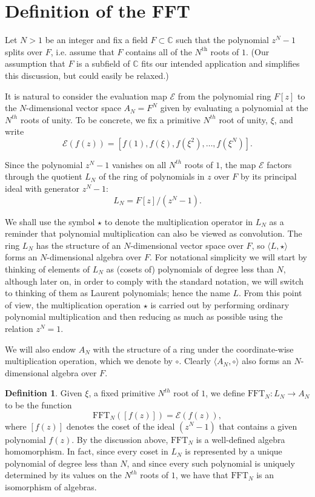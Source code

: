 \documentclass[12pt, letterpaper, oneside]{amsart}
\theoremstyle{definition}
\newtheorem{definition}[para]{Definition}
\theoremstyle{plain}
\numberwithin{equation}{para}
\numberwithin{figure}{section}
\newcommand{\CC}{\mathbb{C}}
\newcommand{\FFT}{\text{FFT}}
\renewcommand{\th}{\text{th}}
\newcommand{\eval}{\mathcal{E}}
\begin{document}
\section{Definition of the FFT}
Let $N > 1$ be an integer and fix a field $F\subset\CC$ such that the polynomial
$z^N - 1$ splits over $F$, i.e. assume that $F$ contains all of the $N^\th$
roots of $1$.  (Our assumption that $F$ is a subfield of $\CC$ fits our intended
application and simplifies this discussion, but could easily be relaxed.)

It is natural to consider the evaluation map $\eval$ from the polynomial ring
$F[z]$ to the $N$-dimensional vector space $A_N=F^N$ given by evaluating a
polynomial at the $N^{th}$ roots of unity.  To be concrete, we fix a primitive
$N^{th}$ root of unity, $\xi$, and write
\[ \eval(f(z)) = [f(1), f(\xi), f(\xi^2), \ldots, f(\xi^N)] . \]

Since the polynomial $z^N - 1$ vanishes on all $N^{th}$ roots of $1$, the map
$\eval$ factors through the quotient $L_N$ of the ring of polynomials in $z$ over $F$
by its principal ideal with generator $z^N - 1$:
$$L_N = F[z]/(z^N - 1).$$

We shall use the symbol $\star$ to denote the multiplication operator in $L_N$
as a reminder that polynomial multiplication can also be viewed as convolution.
The ring $L_N$ has the structure of an $N$-dimensional vector space over $F$, so
$\langle L, \star\rangle$ forms an $N$-dimensional algebra over $F$.  For
notational simplicity we will start by thinking of elements of $L_N$ as (cosets
of) polynomials of degree less than $N$, although later on, in order to comply
with the standard notation, we will switch to thinking of them as Laurent
polynomials; hence the name $L$.  From this point of view, the multiplication
operation $\star$ is carried out by performing ordinary polynomial
multiplication and then reducing as much as possible using the relation
$z^N = 1$.

We will also endow $A_N$ with the structure of a ring under the coordinate-wise
multiplication operation, which we denote by $\circ$.  Clearly
$\langle A_N, \circ\rangle$ also forms an $N$-dimensional algebra over $F$.

\begin{definition}\label{definition:fft}
Given $\xi$, a fixed primitive $N^{th}$ root of $1$, we define
$\FFT_N:L_N \to A_N$ to be the function
\[ \FFT_N([f(z)]) = \eval(f(z)), \]
where $[f(z)]$ denotes the coset of the ideal $(z^N - 1)$ that contains
a given polynomial $f(z)$.  By the discussion above, $\FFT_N$ is a well-defined
algebra homomorphism.  In fact, since every coset in $L_N$ is represented
by a unique polynomial of degree less than $N$, and since every such polynomial
is uniquely determined by its values on the $N^{th}$ roots of $1$, we have
that $\FFT_N$ is an isomorphism of algebras.
\end{definition}
\end{document}
